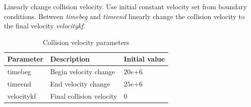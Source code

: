 Linearly change collision velocity. Use initial constant velocity set from boundary conditions. Between \emph{timebeg} and \emph{timeend} linearly change the collision velocity to the final velocity \emph{velocitykf}.

\begin{table}[H]
	\small
	\centering
	\begin{tabular}{l l l}
		\toprule
		Parameter & Description & Initial value \\
		\midrule
		timebeg 	& Begin velocity change & $20e{+6}$\\
		timeend 	& End velocity change & $25e{+6}$\\
		velocitykf 	& Final collision velocity & $0$\\
		\bottomrule
	\end{tabular}
	\caption{Collision velocity parameters}
	\label{tbl:mode_collision_parameters}
\end{table}
